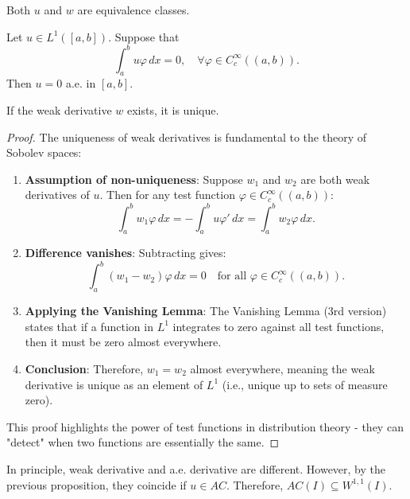 \begin{remark}
Both $u$ and $w$ are equivalence classes.
\end{remark}

\begin{lemma}
Let $u \in L^1([a,b])$. Suppose that
\[
\int_a^b u \varphi \, dx = 0, \quad \forall \varphi \in C_c^\infty((a,b)).
\]
Then $u = 0$ a.e. in $[a,b]$.
\end{lemma}

\begin{proposition}
If the weak derivative $w$ exists, it is unique.
\end{proposition}

\begin{proof}
The uniqueness of weak derivatives is fundamental to the theory of Sobolev spaces:

\begin{enumerate}
\item \textbf{Assumption of non-uniqueness}: Suppose $w_1$ and $w_2$ are both weak derivatives of $u$. Then for any test function $\varphi \in C_c^\infty((a,b))$:
\[
\int_a^b w_1 \varphi \, dx = -\int_a^b u \varphi' \, dx = \int_a^b w_2 \varphi \, dx.
\]

\item \textbf{Difference vanishes}: Subtracting gives:
\[
\int_a^b (w_1 - w_2) \varphi \, dx = 0 \quad \text{for all } \varphi \in C_c^\infty((a,b)).
\]

\item \textbf{Applying the Vanishing Lemma}: The Vanishing Lemma (3rd version) states that if a function in $L^1$ integrates to zero against all test functions, then it must be zero almost everywhere.

\item \textbf{Conclusion}: Therefore, $w_1 = w_2$ almost everywhere, meaning the weak derivative is unique as an element of $L^1$ (i.e., unique up to sets of measure zero).
\end{enumerate}

This proof highlights the power of test functions in distribution theory - they can "detect" when two functions are essentially the same.
\end{proof}

\begin{remark}
In principle, weak derivative and a.e. derivative are different. However, by the previous proposition, they coincide if $u \in AC$. Therefore, $AC(I) \subseteq W^{1,1}(I)$.
\end{remark}

